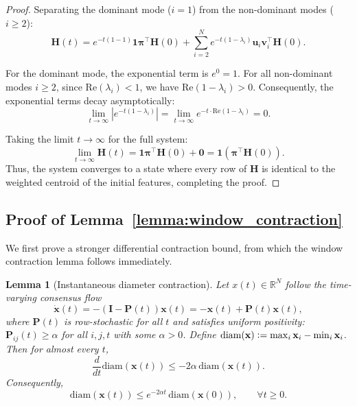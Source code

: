 \documentclass{article}
\newcommand{\defeq}{\vcentcolon=}
\theoremstyle{plain}
\newtheorem{lemma}[theorem]{Lemma}
\theoremstyle{definition}
\theoremstyle{remark}
\begin{document}
\begin{proof}
    Separating the dominant mode ($i=1$) from the non-dominant modes ($i \ge 2$):
    \begin{equation}
        \mathbf{H}(t) = e^{-t(1 - 1)} \mathbf{1}\boldsymbol{\pi}^\top \mathbf{H}(0) + \sum_{i=2}^N e^{-t(1 - \lambda_i)} \mathbf{u}_i \mathbf{v}_i^\top \mathbf{H}(0).
    \end{equation}

    For the dominant mode, the exponential term is $e^0 = 1$. For all non-dominant
    modes $i \ge 2$, since $\text{Re}(\lambda_i) < 1$, we have $\text{Re}(1 -
        \lambda_i) > 0$. Consequently, the exponential terms decay asymptotically:
    \begin{equation}
        \lim_{t \to \infty} \left| e^{-t(1 - \lambda_i)} \right| = \lim_{t \to \infty} e^{-t \cdot \text{Re}(1 - \lambda_i)} = 0.
    \end{equation}

    Taking the limit $t \to \infty$ for the full system:
    \begin{equation}
        \lim_{t \to \infty} \mathbf{H}(t) = \mathbf{1}\boldsymbol{\pi}^\top \mathbf{H}(0) + \mathbf{0} = \mathbf{1} \left( \boldsymbol{\pi}^\top \mathbf{H}(0) \right).
    \end{equation}
    Thus, the system converges to a state where every row of $\mathbf{H}$ is identical to the weighted centroid of the initial features, completing the proof.
\end{proof}

\subsection{Proof of Lemma~\ref{lemma:window_contraction}}
\label{app:tv_proofs}

We first prove a stronger differential contraction bound, from which the window
contraction lemma follows immediately.

\begin{lemma}[Instantaneous diameter contraction]
    \label{lem:instant_contraction}
    Let $x(t)\in\mathbb{R}^N$ follow the time-varying consensus flow
    \[
        \dot{\textbf{x}}(t) = -(\textbf{I} - \textbf{P}(t))\textbf{x}(t) = -\textbf{x}(t) + \textbf{P}(t)\textbf{x}(t),
    \]
    where $\textbf{P}(t)$ is row-stochastic for all $t$ and satisfies uniform
    positivity: $\textbf{P}_{ij}(t)\ge \alpha$ for all $i,j,t$ with some
    $\alpha>0$. Define $\mathrm{diam}(\textbf{x})\defeq \max_i \textbf{x}_i -
        \min_i \textbf{x}_i$. Then for almost every $t$,
    \[
        \frac{d}{dt}\mathrm{diam}(\textbf{x}(t)) \le -2\alpha\,\mathrm{diam}(\textbf{x}(t)).
    \]
    Consequently,
    \[
        \mathrm{diam}(\textbf{x}(t)) \le e^{-2\alpha t}\,\mathrm{diam}(\textbf{x}(0)),\qquad \forall t\ge 0.
    \]
\end{lemma}
\end{document}
